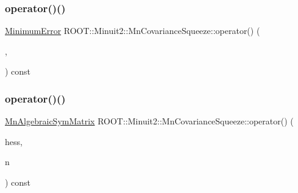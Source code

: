 \mbox{\label{classROOT_1_1Minuit2_1_1MnCovarianceSqueeze_a6f1ea9726d0981faacf7ee0c26326bcd}} 
\subsubsection{\texorpdfstring{operator()()}{operator()()}\hspace{0.1cm}{\footnotesize\ttfamily [6/9]}}
{\footnotesize\ttfamily \mbox{\hyperlink{classROOT_1_1Minuit2_1_1MinimumError}{Minimum\+Error}} R\+O\+O\+T\+::\+Minuit2\+::\+Mn\+Covariance\+Squeeze\+::operator() (\begin{DoxyParamCaption}\item[{const \mbox{\hyperlink{classROOT_1_1Minuit2_1_1MinimumError}{Minimum\+Error}} \&}]{,  }\item[{unsigned int}]{ }\end{DoxyParamCaption}) const}

\mbox{\label{classROOT_1_1Minuit2_1_1MnCovarianceSqueeze_a3271676361fc2c88dad2037f40479fab}} 
\subsubsection{\texorpdfstring{operator()()}{operator()()}\hspace{0.1cm}{\footnotesize\ttfamily [7/9]}}
{\footnotesize\ttfamily \mbox{\hyperlink{namespaceROOT_1_1Minuit2_a9e74ad97f5537a2e80e52b04d98ecc6e}{Mn\+Algebraic\+Sym\+Matrix}} R\+O\+O\+T\+::\+Minuit2\+::\+Mn\+Covariance\+Squeeze\+::operator() (\begin{DoxyParamCaption}\item[{const \mbox{\hyperlink{namespaceROOT_1_1Minuit2_a9e74ad97f5537a2e80e52b04d98ecc6e}{Mn\+Algebraic\+Sym\+Matrix}} \&}]{hess,  }\item[{unsigned int}]{n }\end{DoxyParamCaption}) const}

